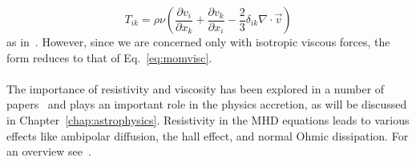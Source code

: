 \begin{equation}
  T_{ik}=\rho\nu\left(\frac{\partial v_i}{\partial x_k}+\frac{\partial v_k}{\partial x_i}-\frac23\delta_{ik}\nabla\cdot\vec v\right)
\end{equation}
as in~\cite{Fromang2007,Landau1959}. However, since we are concerned only with isotropic viscous forces, the form reduces to that of Eq.~\ref{eq:momvisc}. \\
\\
The importance of resistivity and viscosity has been explored in a number of papers~\cite{Fromang2007,Lesur2007,Gammie1996} and plays an important role in the physics accretion, as will be discussed in Chapter~\ref{chap:astrophysics}. Resistivity in the MHD equations leads to various effects like ambipolar diffusion, the hall effect, and normal Ohmic dissipation. For an overview see~\citet{KunzNonIdeal}.

